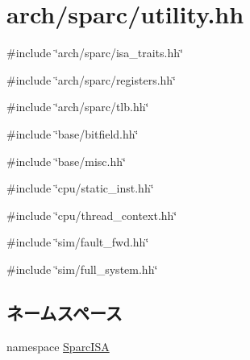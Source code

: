 \hypertarget{sparc_2utility_8hh}{
\section{arch/sparc/utility.hh}
\label{sparc_2utility_8hh}
}
{\ttfamily \#include \char`\"{}arch/sparc/isa\_\-traits.hh\char`\"{}}\par
{\ttfamily \#include \char`\"{}arch/sparc/registers.hh\char`\"{}}\par
{\ttfamily \#include \char`\"{}arch/sparc/tlb.hh\char`\"{}}\par
{\ttfamily \#include \char`\"{}base/bitfield.hh\char`\"{}}\par
{\ttfamily \#include \char`\"{}base/misc.hh\char`\"{}}\par
{\ttfamily \#include \char`\"{}cpu/static\_\-inst.hh\char`\"{}}\par
{\ttfamily \#include \char`\"{}cpu/thread\_\-context.hh\char`\"{}}\par
{\ttfamily \#include \char`\"{}sim/fault\_\-fwd.hh\char`\"{}}\par
{\ttfamily \#include \char`\"{}sim/full\_\-system.hh\char`\"{}}\par
\subsection*{ネームスペース}
\begin{DoxyCompactItemize}
\item 
namespace \hyperlink{namespaceSparcISA}{SparcISA}
\end{DoxyCompactItemize}
